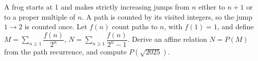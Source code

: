 A frog starts at 1 and makes strictly increasing jumps from $n$ either to $n+1$ or to a proper multiple of $n$. A path is counted by its visited integers, so the jump $1\to2$ is counted once. Let $f(n)$ count paths to $n$, with $f(1)=1$, and define $M = \sum_{n\ge1} \dfrac{f (n)}{2^n}$, $N = \sum_{n\ge1} \dfrac{f (n)}{2^n-1}$. Derive an affine relation $N=P(M)$ from the path recurrence, and compute $P(\sqrt{2025})$.
